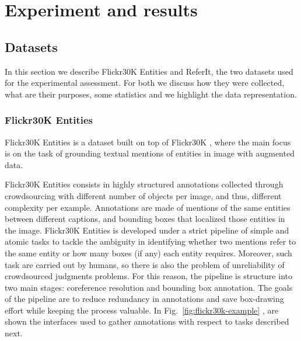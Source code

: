 
\chapter{Experiment and results}
\label{ch:experiments}

\section{Datasets}
\label{sec:datasets}

In this section we describe Flickr30K Entities and ReferIt, the two
datasets used for the experimental assessment. For both we discuss how
they were collected, what are their purposes, some statistics and we
highlight the data representation.

\subsection{Flickr30K Entities}
\label{subsec:flickr30k}

Flickr30K Entities \cite{plummer2015flickr30k} is a dataset built on
top of Flickr30K \cite{young2014image}, where the main focus is on the
task of grounding textual mentions of entities in image with augmented
data.

Flickr30K Entities consists in highly structured annotations collected
through crowdsourcing with different number of objects per image, and
thus, different complexity per example. Annotations are made of
mentions of the same entities between different captions, and bounding
boxes that localized those entities in the image. Flickr30K Entities
is developed under a strict pipeline of simple and atomic tasks to
tackle the ambiguity in identifying whether two mentions refer to the
same entity or how many boxes (if any) each entity requires. Moreover,
such task are carried out by humans, so there is also the problem of
unreliability of crowdsourced judgments problems. For this reason, the
pipeline is structure into two main stages: coreference resolution and
bounding box annotation. The goals of the pipeline are to reduce
redundancy in annotations and save box-drawing effort while keeping
the process valuable. In Fig.~\ref{fig:flickr30k-example}
\cite{plummer2015flickr30k}, are shown the interfaces used to gather
annotations with respect to tasks described next.

